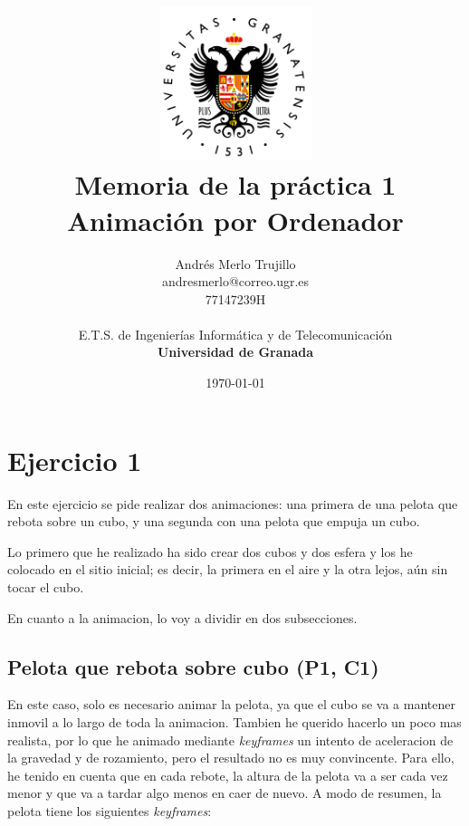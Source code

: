 \documentclass{article}
\title{
\includegraphics[width=1.75in]{imagenes/UGR-Logo.png} \\
\vspace*{1in}
\textbf{Memoria de la práctica 1} \\
Animación por Ordenador \\
\vspace*{0.5in}}
\author{Andrés Merlo Trujillo \\
andresmerlo@correo.ugr.es \\
77147239H \\ 
\vspace*{0.5in} \\
E.T.S. de Ingenierías Informática y de Telecomunicación \\
\textbf{Universidad de Granada}} \date{\today}
\begin{document}
\begin{titlingpage}
\maketitle
\end{titlingpage}

\tableofcontents

\newpage

\pagestyle{fancy}   %

\section{Ejercicio 1}

En este ejercicio se pide realizar dos animaciones: una primera de una pelota que rebota sobre un cubo, y una segunda con una pelota que empuja un cubo.

\bigskip


Lo primero que he realizado ha sido crear dos cubos y dos esfera y los he colocado en el sitio inicial; es decir, la primera en el aire y la otra lejos, aún sin tocar el cubo.




En cuanto a la animacion, lo voy a dividir en dos subsecciones.

\subsection{Pelota que rebota sobre cubo (P1, C1)}

En este caso, solo es necesario animar la pelota, ya que el cubo se va a mantener inmovil a lo largo de toda la animacion. Tambien he querido hacerlo un poco mas realista, por lo que he animado mediante \textit{keyframes} un intento de aceleracion de la gravedad y de rozamiento, pero el resultado no es muy convincente. Para ello, he tenido en cuenta que en cada rebote, la altura de la pelota va a ser cada vez menor y que va a tardar algo menos en caer de nuevo. A modo de resumen, la pelota tiene los siguientes \textit{keyframes}:
\end{document}

